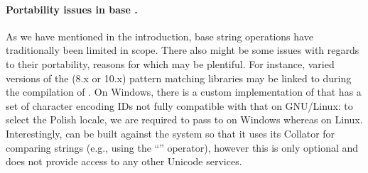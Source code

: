 \documentclass[nojss]{jss}
\begin{document}
\paragraph{Portability issues in base .}
As we have mentioned in the introduction,
base  string operations have traditionally been
limited in scope. There also might be some issues with regards to their portability,
reasons for which may be plentiful.
For instance, varied versions of the
 (8.x or 10.x)
pattern matching libraries may be linked to
during the compilation of . On Windows, there is a custom implementation
of  that has a set of character encoding
IDs not fully compatible with that on GNU/Linux: to select
the Polish locale, we are required to pass 
to  on Windows whereas  on
Linux.
Interestingly,  can be built against the system 
so that it uses its Collator for comparing strings (e.g., using the ``\code{<=}''
operator), however this is only optional and does not provide access to any
other Unicode services.


%









%
%
%
%
%
%
\end{document}
